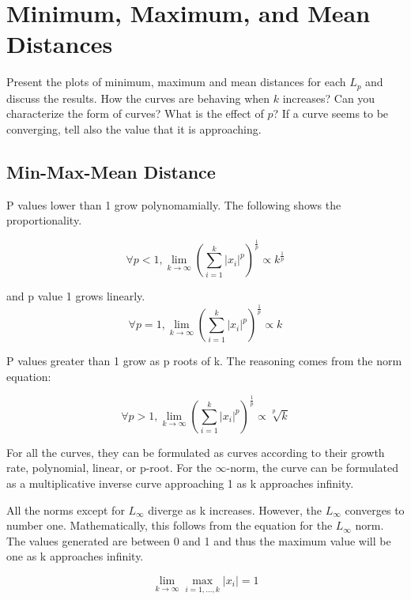 \section{Minimum, Maximum, and Mean Distances}
Present the plots of minimum, maximum and mean distances for each \( L_p \) and discuss the results. How the curves are behaving when \( k \) increases? Can you characterize the form of curves? What is the effect of \( p \)? If a curve seems to be converging, tell also the value that it is approaching.
\subsection{Min-Max-Mean Distance}

P values lower than 1 grow polynomamially.
The following shows the proportionality.

\begin{equation}
    \forall p < 1, \lim_{k \to \infty} \left( \sum_{i=1}^{k} |x_i|^p \right)^{\frac{1}{p}} \propto k^{\frac{1}{p}}
\end{equation}

and p value 1 grows linearly.
\begin{equation}
    \forall p = 1, \lim_{k \to \infty} \left( \sum_{i=1}^{k} |x_i|^p \right)^{\frac{1}{p}} \propto k
\end{equation}

P values greater than 1 grow as p roots of k. The reasoning comes from the norm equation:

\begin{equation}
    \forall p > 1, \lim_{k \to \infty} \left( \sum_{i=1}^{k} |x_i|^p \right)^{\frac{1}{p}} \propto \sqrt[p]{k}
\end{equation}

For all the curves, they can be formulated as curves according to their growth rate, polynomial, linear, or p-root. For the \(\infty\)-norm, the curve can be formulated as a multiplicative inverse curve approaching 1 as k approaches infinity.


All the norms except for \( L_\infty \) diverge as k increases. However, the \( L_\infty \) converges to number one. Mathematically, this follows from the equation for the \( L_\infty \) norm. The values generated are between 0 and 1 and thus the maximum value will be one as k approaches infinity.



\begin{equation}
    \lim_{k \to \infty} \max_{i=1,\ldots,k} |x_i| = 1
\end{equation}

